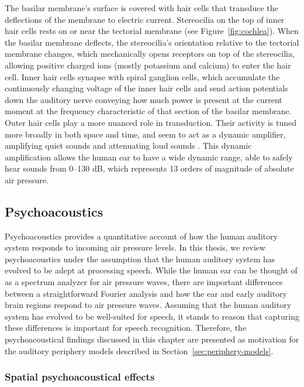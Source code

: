 The basilar membrane's surface is covered
with hair cells that transduce
the deflections of the membrane
to electric current.
Stereocilia on the top of inner hair cells
rests on or near the tectorial membrane
(see Figure~\ref{fig:cochlea}).
When the basilar membrane deflects,
the stereocilia's orientation
relative to the tectorial membrane changes,
which mechanically opens receptors
on top of the stereocilia,
allowing positive charged ions
(mostly potassium and calcium)
to enter the hair cell.
Inner hair cells synapse with
spiral ganglion cells,
which accumulate the continuously
changing voltage of the inner hair cells
and send action potentials
down the auditory nerve
conveying how much power
is present at the current moment
at the frequency characteristic
of that section of the basilar membrane.
Outer hair cells play a more nuanced
role in transduction.
Their activity is tuned
more broadly in both space and time,
and seem to act as a dynamic amplifier,
amplifying quiet sounds and
attenuating loud sounds
\citep{dallos1992}.
This dynamic amplification allows
the human ear to have a wide dynamic range,
able to safely hear sounds from 0--130 dB,
which represents 13 orders of magnitude
of absolute air pressure.

\subsection{Psychoacoustics}
\label{sec:psychoacoustics}

Psychoacoustics provides a quantitative account
of how the human auditory system
responds to incoming air pressure levels.
In this thesis, we review psychoacoustics
under the assumption that
the human auditory system
has evolved to be adept at processing speech.
While the human ear can be thought of
as a spectrum analyzer for air pressure waves,
there are important differences between
a straightforward Fourier analysis
and how the ear and early auditory brain regions
respond to air pressure waves.
Assuming that the human
auditory system has evolved to be
well-suited for speech,
it stands to reason that
capturing these differences
is important for speech recognition.
Therefore, the psychoacoustical findings
discussed in this chapter
are presented as motivation for the
auditory periphery models described
in Section~\ref{sec:periphery-models}.

\subsubsection{Spatial psychoacoustical effects}

